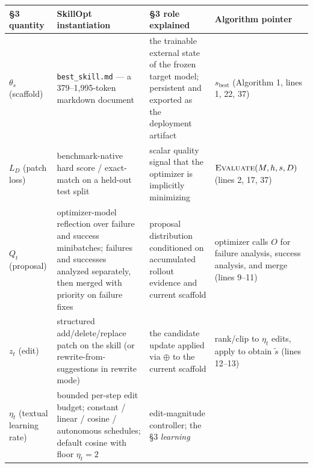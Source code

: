 \documentclass[
]{article}
\newcounter{none} %
\begin{document}
{\def\LTcaptype{none} %
\begin{longtable}[]{@{}
  >{\raggedright\arraybackslash}p{}
  >{\raggedright\arraybackslash}p{}
  >{\raggedright\arraybackslash}p{}
  >{\raggedright\arraybackslash}p{}@{}}
\toprule\noalign{}
\begin{minipage}[b]{\linewidth}\raggedright
§3 quantity
\end{minipage} & \begin{minipage}[b]{\linewidth}\raggedright
SkillOpt instantiation
\end{minipage} & \begin{minipage}[b]{\linewidth}\raggedright
§3 role explained
\end{minipage} & \begin{minipage}[b]{\linewidth}\raggedright
Algorithm pointer
\end{minipage} \\
\midrule\noalign{}
\endhead
\bottomrule\noalign{}
\endlastfoot
\(\theta_s\) (scaffold) & \texttt{best\_skill.md} --- a 379--1,995-token
markdown document & the trainable external state of the frozen target
model; persistent and exported as the deployment artifact &
\(s_{\text{best}}\) (Algorithm 1, lines 1, 22, 37) \\
\(L_D\) (patch loss) & benchmark-native hard score / exact-match on a
held-out test split & scalar quality signal that the optimizer is
implicitly minimizing & \(\textsc{Evaluate}(M, h, s, D)\) (lines 2, 17,
37) \\
\(Q_t\) (proposal) & optimizer-model reflection over failure and success
minibatches; failures and successes analyzed separately, then merged
with priority on failure fixes & proposal distribution conditioned on
accumulated rollout evidence and current scaffold & optimizer calls
\(O\) for failure analysis, success analysis, and merge (lines 9--11) \\
\(z_t\) (edit) & structured add/delete/replace patch on the skill (or
rewrite-from-suggestions in rewrite mode) & the candidate update applied
via \(\oplus\) to the current scaffold & rank/clip to \(\eta_t\) edits,
apply to obtain \(\tilde s\) (lines 12--13) \\
\(\eta_t\) (textual learning rate) & bounded per-step edit budget;
constant / linear / cosine / autonomous schedules; default cosine with
floor \(\eta_t=2\) & edit-magnitude controller; the §3 \emph{learning
}
\end{longtable}}
\end{document}
